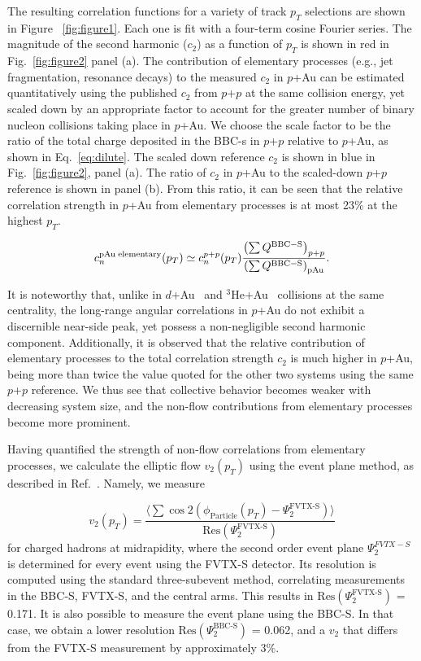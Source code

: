 \documentclass[%
reprint,
showpacs,preprintnumbers,
 amsmath,amssymb,
 aps,
]{revtex4-1}
\newcommand{\pt}{\mbox{$p_T$}\xspace}
\newcommand{\dau}{\mbox{$d$+Au}\xspace}
\newcommand{\pau}{\mbox{$p$+Au}\xspace}
\newcommand{\hau}{\mbox{$^3\text{He}$+Au}\xspace}
\newcommand{\pp}{\mbox{$p$+$p$}\xspace}
\begin{document}
The resulting correlation functions for a variety of track \pt selections are shown in Figure ~\ref{fig:figure1}. Each one is fit with a four-term cosine Fourier series. The magnitude of the second harmonic ($c_{2}$) as a function of \pt is shown in red in Fig.~\ref{fig:figure2} panel (a). The contribution of elementary processes (e.g., jet fragmentation, resonance decays) to the measured $c_2$ in \pau can be estimated quantitatively using the published $c_2$ from \pp at the same collision energy, yet scaled down by an appropriate factor to account for the greater number of binary nucleon collisions taking place in \pau. We choose the scale factor to be the ratio of the total charge deposited in the BBC-s in \pp relative to \pau, as shown in Eq.~\ref{eq:dilute}. The scaled down reference $c_{2}$ is shown in blue in Fig.~\ref{fig:figure2}, panel (a). The ratio of $c_2$ in \pau to the scaled-down \pp reference is shown in panel (b). From this ratio, it can be seen that the relative correlation strength in \pau from elementary processes is at most 23\% at the highest \pt.

\begin{equation}
c_{n}^{{\rm pAu \; elementary}}(p_{T}) \simeq c_{n}^{p+p}(p_{T})
\frac{\left( \sum Q^{{\rm BBC-S}} \right)_{p+p}}
{\left( \sum Q^{{\rm BBC-S}} \right)_{{\rm pAu}}
}.
\label{eq:dilute}
\end{equation}

It is noteworthy that, unlike in \dau~\cite{adare_measurement_2014} and \hau~\cite{PhysRevLett.115.142301} collisions at the same centrality, the long-range angular correlations in \pau do not exhibit a discernible near-side peak, yet possess a non-negligible second harmonic component. Additionally, it is observed that the relative contribution of elementary processes to the total correlation strength $c_2$ is much higher in \pau, being more than twice the value quoted for the other two systems using the same \pp reference. We thus see that collective behavior becomes weaker with decreasing system size, and the non-flow contributions from elementary processes become more prominent. 

Having quantified the strength of non-flow correlations from elementary processes, we calculate the elliptic flow $v_2(p_T)$ using the event plane method, as described in Ref.~\cite{Adare:2015ctn}. Namely, we measure 

\begin{equation}
v_{2}(p_{T}) = \frac{\langle\sum \cos 2(\phi_{\text{Particle}}(p_{T})-\Psi^{\text{FVTX-S}}_{2})\rangle}{\text{Res}(\Psi^{\text{FVTX-S}}_{2})}
\end{equation}
for charged hadrons at midrapidity, where the second order event plane $\Psi^{FVTX-S}_{2}$ is determined for every event using the FVTX-S detector. Its resolution is computed using the standard three-subevent method, correlating measurements in the BBC-S, FVTX-S, and the central arms. This results in $\text{Res}(\Psi^{\text{FVTX-S}}_{2})$ = 0.171. It is also possible to measure the event plane using the BBC-S. In that case, we obtain a lower resolution $\text{Res}(\Psi^{\text{BBC-S}}_{2})$ = 0.062, and a $v_2$ that differs from the FVTX-S measurement by approximately 3\%.
\end{document}
